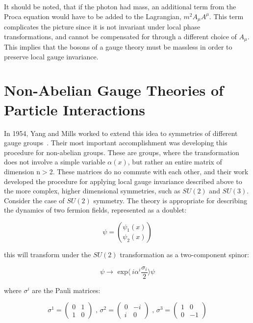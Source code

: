 \par It should be noted, that if the photon had mass, an additional
term from the Proca equation would have to be added to the Lagrangian,
$m^{2}A_{\mu}A^{\mu}$.  This term complicates the picture since it is
not invariant under local phase transformations, and cannot be
compensated for through a different choice of $A_{\mu}$.  This implies
that the bosons of a gauge theory must be massless in order to
preserve local gauge invariance.  


\section{Non-Abelian Gauge Theories of Particle Interactions}
\label{non_abelian_gauge_theory_overview}
\par In 1954, Yang and Mills worked to extend this idea to symmetries
of different gauge groups~\cite{th:Yang_Mills}.  Their most important
accomplishment was developing this procedure for non-abelian groups.
These are groups, where the transformation does not involve a simple
variable $\alpha(x)$, but rather an entire matrix of dimension n$>$2.
These matrices do no commute with each other, and their work developed
the procedure for applying local gauge invariance described above to
the more complex, higher dimensional symmetries, such as $SU(2)$ and
$SU(3)$.  Consider the case of $SU(2)$ symmetry.  The theory is
appropriate for describing the dynamics of two fermion fields,
represented as a doublet:

\begin{equation}\label{eq:yang_mills_fermion_doublet}
\psi = \binom{\psi_{1}(x)}{\psi_{2}(x)}
\end{equation}

\noindent this will transform under the $SU(2)$ transformation as a
two-component spinor:

\begin{equation}\label{eq:yang_mills_fermion_transformaiton}
\psi \rightarrow \text{ exp}\langle~i\alpha^{i}\frac{\sigma_{i}}{2}\rangle\psi
\end{equation} 

\noindent where $\sigma^{i}$ are the Pauli matrices:

\begin{equation}\label{eq:pauli_matrices}
\sigma^{1} = 
  \begin{pmatrix}
    0  &  1 \\
    1  &  0
  \end{pmatrix}
\text{   ,    }
\sigma^{2} = 
  \begin{pmatrix}
    0  & -i \\
    i  &  0
  \end{pmatrix}
\text{   ,   }
\sigma^{3} = 
  \begin{pmatrix}
    1  &   0 \\
    0  & -1
  \end{pmatrix}
\end{equation}

